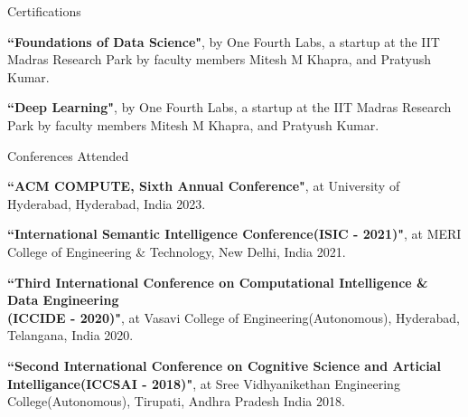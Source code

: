 \documentclass{resume} %
\begin{document}
\begin{rSection}{Certifications}
	
	\begin{rSubsection}{}{}{}{}
		\item \textbf{``Foundations of Data Science"},  by One Fourth Labs, a startup at the IIT Madras Research Park by faculty members Mitesh M Khapra, and Pratyush Kumar.
		\item \textbf{``Deep Learning"}, by One Fourth Labs, a startup at the IIT Madras Research Park by faculty members Mitesh M Khapra, and Pratyush Kumar.
		
	\end{rSubsection}
	
\end{rSection}

\begin{rSection}{Conferences Attended}
	
	\begin{rSubsection}{}{}{}{}
		\item \textbf{``ACM COMPUTE, Sixth Annual Conference"}, at University of Hyderabad, Hyderabad, India 2023.
		\item \textbf{``International Semantic Intelligence Conference(ISIC - 2021)"}, at MERI College of Engineering \& Technology, New Delhi, India 2021.
		\item \textbf{``Third International Conference on Computational Intelligence \& Data Engineering\\(ICCIDE - 2020)"}, at Vasavi College of Engineering(Autonomous), Hyderabad, Telangana, India 2020.
		\item \textbf{``Second International Conference on Cognitive Science and Articial Intelligance(ICCSAI - 2018)"}, at Sree Vidhyanikethan Engineering College(Autonomous), Tirupati, Andhra Pradesh India 2018.

	\end{rSubsection}

\end{rSection}
\end{document}
